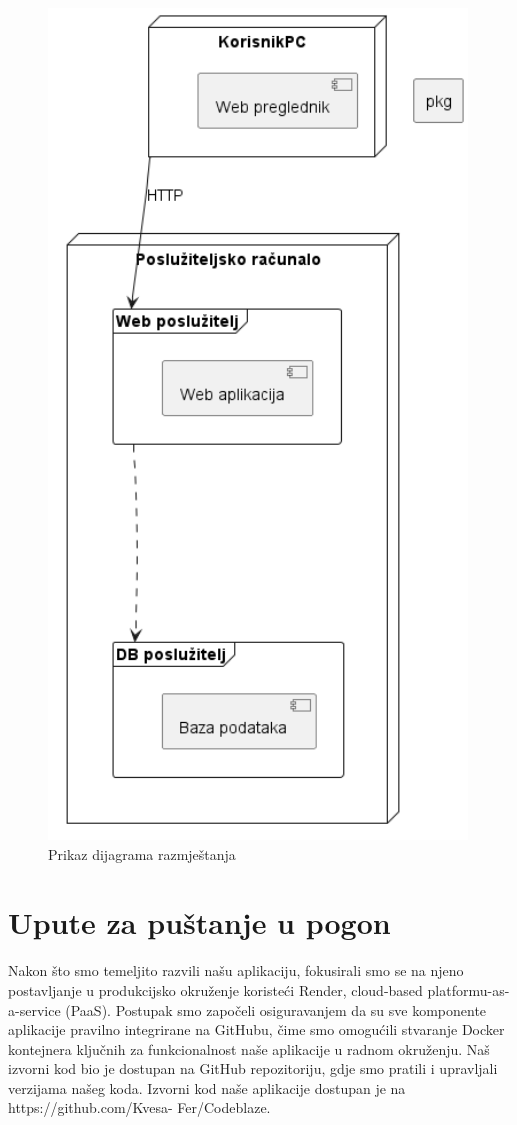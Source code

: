 		\begin{figure} [H]
			\centering
			\includegraphics[width=0.7\linewidth]{dijagrami/dijagramRazmjestanja.png}
			\caption{Prikaz dijagrama razmještanja}
			\label{fig:Prikaz dijagrama razmještanja}
		\end{figure}

			\eject 
		
		\section{Upute za puštanje u pogon}

        Nakon što smo temeljito razvili našu aplikaciju, fokusirali smo se na njeno postavljanje u produkcijsko okruženje koristeći Render, cloud-based platformu-as-a-service (PaaS). Postupak smo započeli osiguravanjem da su sve komponente aplikacije pravilno integrirane na GitHubu, čime smo omogućili stvaranje Docker kontejnera ključnih za funkcionalnost naše aplikacije u radnom okruženju. Naš izvorni kod bio je dostupan na GitHub repozitoriju, gdje smo pratili i upravljali verzijama našeg koda.  Izvorni kod naše aplikacije dostupan je na https://github.com/Kvesa- Fer/Codeblaze.

